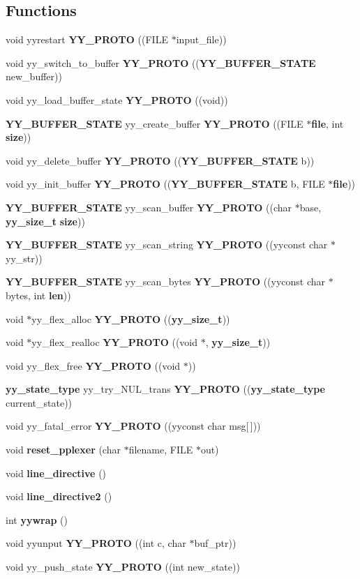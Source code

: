 \subsection*{Functions}
\begin{CompactItemize}
\item 
void yyrestart {\bf YY\_\-PROTO} ((FILE $\ast$input\_\-file))
\item 
void yy\_\-switch\_\-to\_\-buffer {\bf YY\_\-PROTO} (({\bf YY\_\-BUFFER\_\-STATE} new\_\-buffer))
\item 
void yy\_\-load\_\-buffer\_\-state {\bf YY\_\-PROTO} ((void))
\item 
{\bf YY\_\-BUFFER\_\-STATE} yy\_\-create\_\-buffer {\bf YY\_\-PROTO} ((FILE $\ast${\bf file}, int {\bf size}))
\item 
void yy\_\-delete\_\-buffer {\bf YY\_\-PROTO} (({\bf YY\_\-BUFFER\_\-STATE} b))
\item 
void yy\_\-init\_\-buffer {\bf YY\_\-PROTO} (({\bf YY\_\-BUFFER\_\-STATE} b, FILE $\ast${\bf file}))
\item 
{\bf YY\_\-BUFFER\_\-STATE} yy\_\-scan\_\-buffer {\bf YY\_\-PROTO} ((char $\ast$base, {\bf yy\_\-size\_\-t} {\bf size}))
\item 
{\bf YY\_\-BUFFER\_\-STATE} yy\_\-scan\_\-string {\bf YY\_\-PROTO} ((yyconst char $\ast$yy\_\-str))
\item 
{\bf YY\_\-BUFFER\_\-STATE} yy\_\-scan\_\-bytes {\bf YY\_\-PROTO} ((yyconst char $\ast$bytes, int {\bf len}))
\item 
void $\ast$yy\_\-flex\_\-alloc {\bf YY\_\-PROTO} (({\bf yy\_\-size\_\-t}))
\item 
void $\ast$yy\_\-flex\_\-realloc {\bf YY\_\-PROTO} ((void $\ast$, {\bf yy\_\-size\_\-t}))
\item 
void yy\_\-flex\_\-free {\bf YY\_\-PROTO} ((void $\ast$))
\item 
{\bf yy\_\-state\_\-type} yy\_\-try\_\-NUL\_\-trans {\bf YY\_\-PROTO} (({\bf yy\_\-state\_\-type} current\_\-state))
\item 
void yy\_\-fatal\_\-error {\bf YY\_\-PROTO} ((yyconst char msg[$\,$]))
\item 
void {\bf reset\_\-pplexer} (char $\ast$filename, FILE $\ast$out)
\item 
void {\bf line\_\-directive} ()
\item 
void {\bf line\_\-directive2} ()
\item 
int {\bf yywrap} ()
\item 
void yyunput {\bf YY\_\-PROTO} ((int c, char $\ast$buf\_\-ptr))
\item 
void yy\_\-push\_\-state {\bf YY\_\-PROTO} ((int new\_\-state))
\end{CompactItemize}
